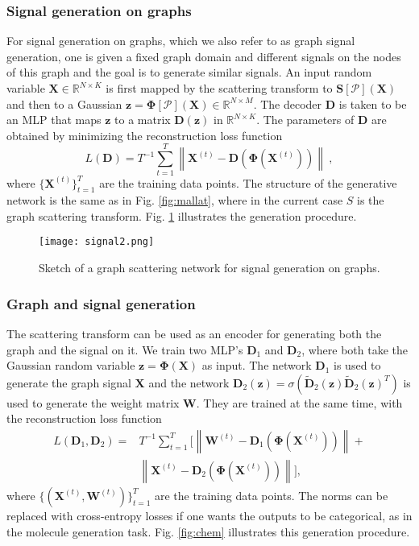 \documentclass[conference]{IEEEtran}
\def\RR{\mathbb{R}}
\def\cP{\mathcal{P}}
\def\BD{\boldsymbol{D}}
\def\BS{\boldsymbol{S}}
\def\BW{\boldsymbol{W}}
\def\BX{\boldsymbol{X}}
\def\Bz{\boldsymbol{z}}
\def\BPhi{\boldsymbol{\Phi}}
\newcommand{\norm}[1]{\left\lVert#1\right\rVert}
\begin{document}
\subsubsection{Signal generation on graphs}\label{subsec:theographsignalgen}
For signal generation on graphs, which we also refer to as graph signal generation, one is given a fixed graph domain and different signals on the nodes of this graph and the goal is to generate similar signals. An input random variable $\BX \in \RR^{N \times K}$ is first mapped by the scattering transform to $\BS[\cP](\BX)$ and then to a Gaussian $\Bz = \BPhi[\cP](\BX)\in \RR^{N \times M}$. The decoder $\BD$ is taken to be an MLP that maps $\Bz$ to a matrix $\BD(\Bz)$ in $\RR^{N \times K}$. The parameters of $\BD$ are obtained by minimizing the reconstruction loss function 
\begin{equation}\label{eq:lossgraphsignalgen}
    L(\BD) = T^{-1} \sum_{t=1}^T \norm{\BX^{(t)} - \BD(\BPhi(\BX^{(t)}))} ~, 
\end{equation}
where $\{ \BX^{(t)} \}_{t=1}^T$ are the training data points.
The structure of the generative network is the same as in Fig. \ref{fig:mallat}, where in the current case $S$ is the graph scattering transform.
Fig. \ref{fig:signal} illustrates the generation procedure.

\begin{figure}[t]
    \centering
    \texttt{[image: signal2.png]}
    \caption{Sketch of a graph scattering network for signal generation on graphs.} \label{fig:signal}
\end{figure}

\subsubsection{Graph and signal generation}\label{subsec:theographandsignalgen}
The scattering transform can be used as an encoder for generating both the graph and the signal on it. We train two MLP's $\BD_1$ and $\BD_2$, where both take the Gaussian random variable $\Bz = \BPhi(\BX)$ as input. The network $\BD_1$ is used to generate the graph signal $\BX$ and the network $\BD_2(\Bz) = \sigma(\tilde{\BD}_2(\Bz) \tilde{\BD}_2(\Bz)^T)$ is used to generate the weight matrix $\BW$. They are trained at the same time, with the reconstruction loss function 
\begin{equation}\label{eq:lossgraphandsignal}
\begin{aligned}
 L(\BD_1, \BD_2) = & T^{-1} \sum_{t=1}^T \Big[ \norm{\BW^{(t)} - \BD_1(\BPhi(\BX^{(t)}))} + \\
  & \norm{\BX^{(t)} - \BD_2(\BPhi(\BX^{(t)}))} \Big],
\end{aligned}
\end{equation}
where $\{ ( \BX^{(t)}, \BW^{(t)} ) \}_{t=1}^T$ are the training data points. The norms can be replaced with cross-entropy losses if one wants the outputs to be categorical, {as in the molecule generation task}.
Fig. \ref{fig:chem} illustrates this generation procedure. 
\end{document}
